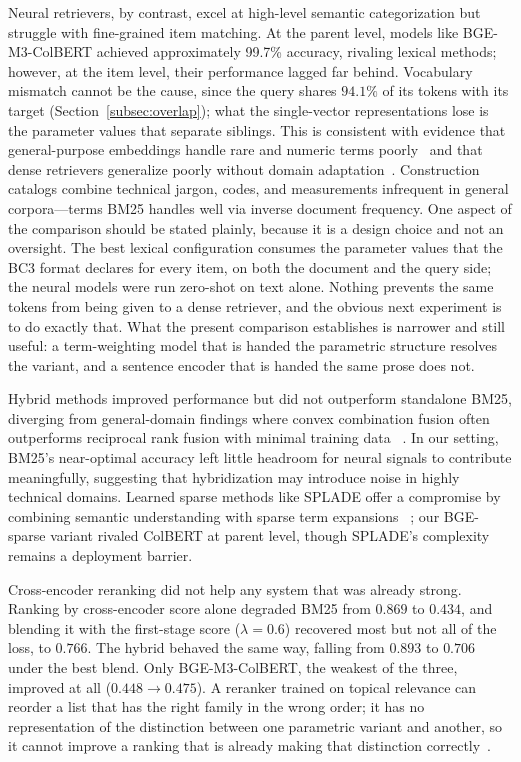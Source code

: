 \documentclass[preprint,review,12pt]{elsarticle}
\begin{document}
Neural retrievers, by contrast, excel at high-level semantic categorization but struggle with fine-grained item matching. At the parent level, models like BGE-M3-ColBERT achieved approximately 99.7\% accuracy, rivaling lexical methods; however, at the item level, their performance lagged far behind. Vocabulary mismatch cannot be the cause, since the query shares $94.1\%$ of its tokens with its target (Section~\ref{subsec:overlap}); what the single-vector representations lose is the parameter values that separate siblings. This is consistent with evidence that general-purpose embeddings handle rare and numeric terms poorly~\cite{tang2024we} and that dense retrievers generalize poorly without domain adaptation~\cite{li2022domain}. Construction catalogs combine technical jargon, codes, and measurements infrequent in general corpora—terms BM25 handles well via inverse document frequency. One aspect of the comparison should be stated plainly, because it is a design choice and not an oversight. The best lexical configuration consumes the parameter values that the BC3 format declares for every item, on both the document and the query side; the neural models were run zero-shot on text alone. Nothing prevents the same tokens from being given to a dense retriever, and the obvious next experiment is to do exactly that. What the present comparison establishes is narrower and still useful: a term-weighting model that is handed the parametric structure resolves the variant, and a sentence encoder that is handed the same prose does not.

Hybrid methods improved performance but did not outperform standalone BM25, diverging from general-domain findings where convex combination fusion often outperforms reciprocal rank fusion with minimal training data ~\cite{bruch2023analysis}. In our setting, BM25's near-optimal accuracy left little headroom for neural signals to contribute meaningfully, suggesting that hybridization may introduce noise in highly technical domains. Learned sparse methods like SPLADE offer a compromise by combining semantic understanding with sparse term expansions ~\cite{formal2021splade}; our BGE-sparse variant rivaled ColBERT at parent level, though SPLADE's complexity remains a deployment barrier.

Cross-encoder reranking did not help any system that was already strong. Ranking by cross-encoder score alone degraded BM25 from $0.869$ to $0.434$, and blending it with the first-stage score ($\lambda=0.6$) recovered most but not all of the loss, to $0.766$. The hybrid behaved the same way, falling from $0.893$ to $0.706$ under the best blend. Only BGE-M3-ColBERT, the weakest of the three, improved at all ($0.448 \to 0.475$). A reranker trained on topical relevance can reorder a list that has the right family in the wrong order; it has no representation of the distinction between one parametric variant and another, so it cannot improve a ranking that is already making that distinction correctly~\cite{nogueiraDocumentRankingPretrained2020, zhuang2023rankt5}.
\end{document}
